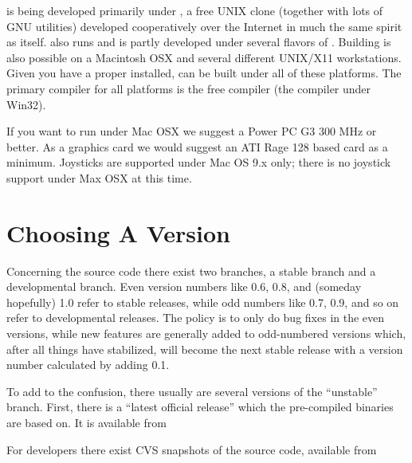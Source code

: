 \FlightGear{} is being developed primarily under , a free UNIX clone
(together with lots of GNU utilities) developed cooperatively over the Internet in much
the same spirit as \FlightGear{} itself. \FlightGear{} also runs and is partly developed
under several flavors of . Building \FlightGear{} is also possible on a Macintosh OSX
and several different UNIX/X11 workstations. Given you have a proper  installed,
\FlightGear{} can be built under all of these platforms. The primary compiler for all platforms is
the free  compiler (the   compiler under Win32).

If you want to run \FlightGear{} under Mac OSX we suggest a Power PC G3 300 MHz or better. As a
graphics card we would suggest an ATI Rage 128 based card as a minimum. Joysticks are supported
under Mac OS 9.x only; there is no joystick support under Max OSX at this time.


\section{Choosing A Version}

Concerning the \FlightGear{} source code there exist two branches, a stable branch and a
developmental branch. Even version numbers
like 0.6, 0.8, and (someday hopefully) 1.0 refer to stable releases, while odd
numbers like 0.7, 0.9, and so on refer to developmental releases. The policy is to only do
bug fixes in the even versions, while new features are generally added to odd-numbered
versions which, after all things have stabilized, will become the next stable release
with a version number calculated by adding 0.1.\label{branches}

To add to the confusion, there usually are several versions of the ``unstable''
branch. First, there is a ``latest official release'' which the pre-compiled binaries are based
on.  It is available from
\medskip

\medskip

For developers there exist CVS snapshots of the
source code, available from
 \medskip


